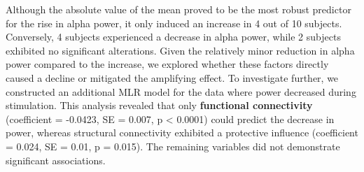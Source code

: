\documentclass[../main.tex]{subfiles}
\begin{document}
Although the absolute value of the mean proved to be the most robust predictor for the rise in alpha power, it only induced an increase in 4 out of 10 subjects.
Conversely, 4 subjects experienced a decrease in alpha power, while 2 subjects exhibited no significant alterations.
Given the relatively minor reduction in alpha power compared to the increase, we explored whether these factors directly caused a decline or mitigated the amplifying effect.
To investigate further, we constructed an additional MLR model for the data where power decreased during stimulation.
This analysis revealed that only \textbf{functional connectivity} (coefficient = -0.0423, SE = 0.007, p < 0.0001) could predict the decrease in power, whereas structural connectivity exhibited a protective influence (coefficient = 0.024, SE = 0.01, p = 0.015).
The remaining variables did not demonstrate significant associations.
\end{document}
